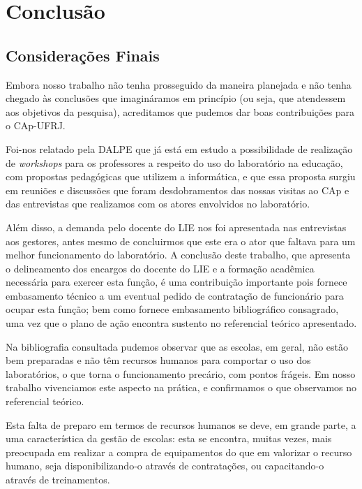 \chapter{Conclusão}\label{chp:LABEL_CHP_CON}

\section{Considerações Finais}\label{chp:LABEL_CHP_CONC_SEC_CONS_FIN}

Embora nosso trabalho não tenha prosseguido da maneira planejada e não tenha chegado às conclusões que imagináramos em princípio (ou seja, que atendessem aos objetivos da pesquisa), acreditamos que pudemos dar boas contribuições para o CAp-UFRJ.

Foi-nos relatado pela DALPE que já está em estudo a possibilidade de realização de \textit{workshops} para os professores a respeito do uso do laboratório na educação, com propostas pedagógicas que utilizem a informática, e que essa proposta surgiu em reuniões e discussões que foram desdobramentos das nossas visitas ao CAp e das entrevistas que realizamos com os atores envolvidos no laboratório.

Além disso, a demanda pelo docente do LIE nos foi apresentada nas entrevistas aos gestores, antes mesmo de concluirmos que este era o ator que faltava para um melhor funcionamento do laboratório. A conclusão deste trabalho, que apresenta o delineamento dos encargos do docente do LIE e a formação acadêmica necessária para exercer esta função, é uma contribuição importante pois fornece embasamento técnico a um eventual pedido de contratação de funcionário para ocupar esta função; bem como fornece embasamento bibliográfico consagrado, uma vez que o plano de ação encontra sustento no referencial teórico apresentado.

Na bibliografia consultada pudemos observar que as escolas, em geral, não estão bem preparadas e não têm recursos humanos para comportar o uso dos laboratórios, o que torna o funcionamento precário, com pontos frágeis. Em nosso trabalho vivenciamos este aspecto na prática, e confirmamos o que observamos no referencial teórico.

Esta falta de preparo em termos de recursos humanos se deve, em grande parte, a uma característica da gestão de escolas: esta se encontra, muitas vezes, mais preocupada em realizar a compra de equipamentos do que em valorizar o recurso humano, seja disponibilizando-o através de contratações, ou capacitando-o através de treinamentos.

